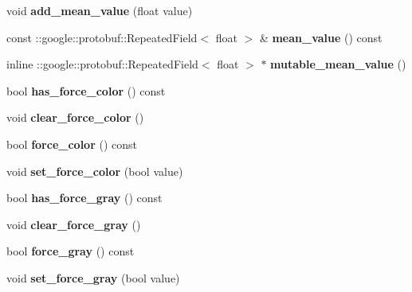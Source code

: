 \begin{DoxyCompactItemize}
\mbox{\label{classcaffe_1_1_transformation_parameter_a77f824ddaa858caadb248109b924e991}} 
void {\bfseries add\+\_\+mean\+\_\+value} (float value)
\item 
\mbox{\label{classcaffe_1_1_transformation_parameter_a090a92490c1a677be95e1de3f5644892}} 
const \+::google\+::protobuf\+::\+Repeated\+Field$<$ float $>$ \& {\bfseries mean\+\_\+value} () const
\item 
\mbox{\label{classcaffe_1_1_transformation_parameter_ad0cd27fd0d0e46c89e9841af69bd475e}} 
inline \+::google\+::protobuf\+::\+Repeated\+Field$<$ float $>$ $\ast$ {\bfseries mutable\+\_\+mean\+\_\+value} ()
\item 
\mbox{\label{classcaffe_1_1_transformation_parameter_a389fbf86c3d9582c2f67d15882d45fc2}} 
bool {\bfseries has\+\_\+force\+\_\+color} () const
\item 
\mbox{\label{classcaffe_1_1_transformation_parameter_a654260dfe124327a45f194e9628d36fb}} 
void {\bfseries clear\+\_\+force\+\_\+color} ()
\item 
\mbox{\label{classcaffe_1_1_transformation_parameter_a2bf51629de06c251785e1aac22159cfc}} 
bool {\bfseries force\+\_\+color} () const
\item 
\mbox{\label{classcaffe_1_1_transformation_parameter_abc64379295da9d53407434eb8b2de2bb}} 
void {\bfseries set\+\_\+force\+\_\+color} (bool value)
\item 
\mbox{\label{classcaffe_1_1_transformation_parameter_a19f3074ad745c8f6eeedf8ad75f0a443}} 
bool {\bfseries has\+\_\+force\+\_\+gray} () const
\item 
\mbox{\label{classcaffe_1_1_transformation_parameter_af25b6680e1dfea687573701db59ce684}} 
void {\bfseries clear\+\_\+force\+\_\+gray} ()
\item 
\mbox{\label{classcaffe_1_1_transformation_parameter_af223aeaa65456a1e0bb440d7aa3f3e10}} 
bool {\bfseries force\+\_\+gray} () const
\item 
\mbox{\label{classcaffe_1_1_transformation_parameter_a0240305cce1719468726b07a75e9d7bf}} 
void {\bfseries set\+\_\+force\+\_\+gray} (bool value)
\end{DoxyCompactItemize}
